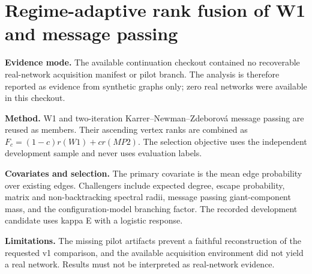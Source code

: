 \documentclass[11pt]{article}
\newcommand{\RealCount}{zero}
\newcommand{\FrozenCovariate}{kappa E}
\newcommand{\FrozenFamily}{logistic}
\begin{document}
\section*{Regime-adaptive rank fusion of W1 and message passing}
\textbf{Evidence mode.} The available continuation checkout contained no
recoverable real-network acquisition manifest or pilot branch. The analysis is
therefore reported as evidence from synthetic graphs only; \RealCount{} real
networks were available in this checkout.

\textbf{Method.} W1 and two-iteration Karrer--Newman--Zdeborová message passing
are reused as members. Their ascending vertex ranks are combined as
$F_c=(1-c)r(W1)+cr(MP2)$. The selection objective uses the independent
development sample and never uses evaluation labels.

\textbf{Covariates and selection.} The primary covariate is the mean edge
probability over existing edges. Challengers include expected degree,
escape probability, matrix and non-backtracking spectral radii, message
passing giant-component mass, and the configuration-model branching factor.
The recorded development candidate uses \FrozenCovariate{} with a
\FrozenFamily{} response.

\textbf{Limitations.} The missing pilot artifacts prevent a faithful
reconstruction of the requested v1 comparison, and the available acquisition
environment did not yield a real network. Results must not be interpreted as
real-network evidence.
\end{document}
